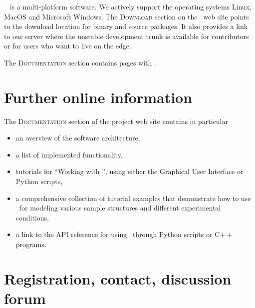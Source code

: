 \BornAgain\
%
%
is a multi-platform software.
We actively support the operating systems
Linux,
%
MacOS
%
and  Microsoft Windows.
%
%
The \textsc{Download} section on the \BornAgain\ web site
points to the download location for
binary and source packages.
It also provides a link to our  server
where the unstable development trunk is available
for contributors or for users who want to live on the edge.

The \textsc{Documentation} section contains
pages with .


\section{Further online information}

The \textsc{Documentation} section of the project web site
contains in particular
\begin{itemize}
\item an overview of the software architecture,
\item a list of implemented functionality,
\item tutorials for ``Working with \BornAgain'',
      using either the Graphical User Interface or
      Python scripts,
\item a comprehensive collection of tutorial examples that demonstrate
   how to use \BornAgain\ for modeling various sample structures
    and different experimental conditions,
\item a link to the API reference for using \BornAgain\ through
   Python scripts or C$++$ programs.
%
%
\end{itemize}


\section{Registration, contact, discussion forum}\label{Snews}


